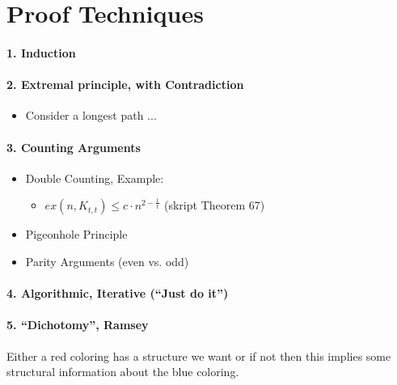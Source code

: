 \documentclass[a4paper]{article}
\begin{document}
\section{Proof Techniques}
\paragraph{1. Induction}

\paragraph{2. Extremal principle, with Contradiction}
\begin{itemize}
    \item Consider a longest path ...
\end{itemize}

\paragraph{3. Counting Arguments}
\begin{itemize}
    \item Double Counting, Example:
        \begin{itemize}
            \item $ ex(n,K_{t,t}) \leq c \cdot n^{2 - \frac{1}{t}} $ (skript Theorem 67) 
        \end{itemize}
    \item Pigeonhole Principle
    \item Parity Arguments (even vs. odd)
\end{itemize}

\paragraph{4. Algorithmic, Iterative (\enquote{Just do it})}

\paragraph{5. \enquote{Dichotomy}, Ramsey}
Either a red coloring has a structure we want or if not then this implies some 
structural information about the blue coloring.
\end{document}
